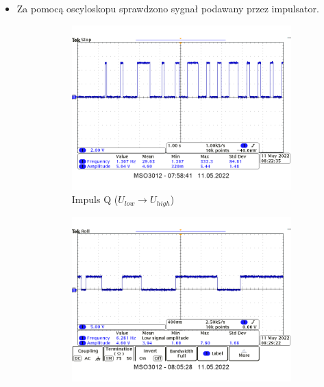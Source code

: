 \begin{itemize}
\begin{figure}[H]
\begin{subfigure}[h]{0.4\textwidth}
                    \caption*{Pomiar dla $H_{high}$}
                \end{subfigure}
            \label{płytka:pomiar_impulsatorów}
        \end{figure}
        Zmierzone napięcie wyniosło:
        \begin{gather}
            \label{płytka:U_low} U_{low} = \textbf{0.182V} \\
            \label{płytka:U_high} U_{high} = \textbf{3.525V}
        \end{gather}
        
    \item Za pomocą oscyloskopu sprawdzono sygnał podawany przez impulsator.
        \begin{figure}[H]
            \centering
                \begin{subfigure}[h]{0.45\textwidth}
                    \includegraphics[width=\textwidth]{img/osciloscope/1_dzialajacy_impuls_Q.png}
                    \caption*{Impuls Q ($U_{low} \xrightarrow{} U_{high}$)}
                \end{subfigure}
                \begin{subfigure}[h]{0.45\textwidth}
                    \includegraphics[width=\textwidth]{img/osciloscope/1_dzialajacy_impuls_!Q.png}

\end{subfigure}
\end{figure}
\end{itemize}
